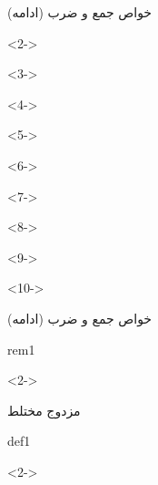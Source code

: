 \def\EMtitlesize{26}\def\EMtitleskip{31}
\begin{frame}{خواص جمع و ضرب (ادامه)}
\begin{uncoverenv}<2->
\end{uncoverenv}
\EMgap
\begin{uncoverenv}<3->
\end{uncoverenv}
\EMgap
\begin{uncoverenv}<4->
\end{uncoverenv}
\EMgap
\begin{uncoverenv}<5->
\end{uncoverenv}
\EMgap
\begin{uncoverenv}<6->
\end{uncoverenv}
\EMgap
\begin{uncoverenv}<7->
\end{uncoverenv}
\EMgap
\begin{uncoverenv}<8->
\end{uncoverenv}
\EMgap
\begin{uncoverenv}<9->
\end{uncoverenv}
\EMgap
\begin{uncoverenv}<10->
\end{uncoverenv}
\end{frame}

\def\EMtitlesize{26}\def\EMtitleskip{31}
\begin{frame}{خواص جمع و ضرب (ادامه)}
\begin{EMbox}{rem}{1}{}
\begin{uncoverenv}<2->
\end{uncoverenv}
\end{EMbox}
\end{frame}

\def\EMtitlesize{26}\def\EMtitleskip{31}
\begin{frame}{مزدوج مختلط}
\begin{EMbox}{def}{1}{}
\begin{uncoverenv}<2->
\end{uncoverenv}
\end{EMbox}
\end{frame}

